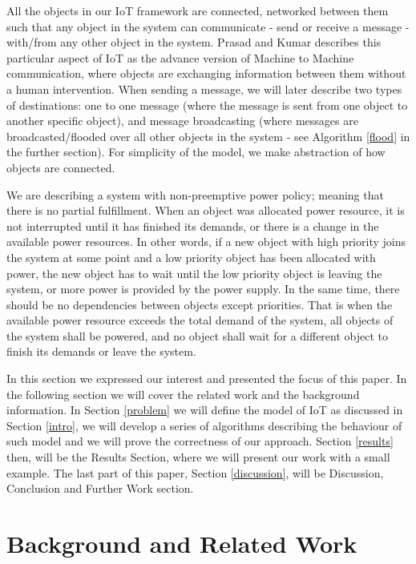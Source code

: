 \documentclass[letterpaper, 10 pt, conference]{ieeeconf}
\begin{document}
All the objects in our IoT framework are connected, networked between them such that any object in the system can communicate - send or receive a message - with/from any other object in the system. Prasad and Kumar \cite{prasad2012energy} describes this particular aspect of IoT as the advance version of Machine to Machine communication, where objects are exchanging information between them without a human intervention. When sending a message, we will later describe two types of destinations: one to one message (where the message is sent from one object to another specific object), and message broadcasting (where messages are broadcasted/flooded over all other objects in the system - see Algorithm \ref{flood} in the further section). For simplicity of the model, we make abstraction of how objects are connected.

We are describing a system with non-preemptive power policy; meaning that there is no partial fulfillment. When an object was allocated power resource, it is not interrupted until it has finished its demands, or there is a change in the available power resources. In other words, if a new object with high priority joins the system at some point and a low priority object has been allocated with power, the new object has to wait until the low priority object is leaving the system, or more power is provided by the power supply. In the same time, there should be no dependencies between objects except priorities. That is when the available power resource exceeds the total demand of the system, all objects of the system shall be powered, and no object shall wait for a different object to finish its demands or leave the system.

In this section we expressed our interest and presented the focus of this paper. In the following section we will cover the related work and the background information. In Section \ref{problem} we will define the model of IoT as discussed in Section \ref{intro}, we will develop a series of algorithms describing the behaviour of such model and we will prove the correctness of our approach. Section \ref{results} then, will be the Results Section, where we will present our work with a small example. The last part of this paper, Section \ref{discussion}, will be Discussion, Conclusion and Further Work section.

\section{Background and Related Work} \label{related}
\end{document}
